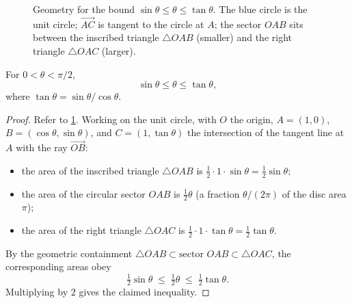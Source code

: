 \begin{figure}[H]
\centering
{}
\caption{Geometry for the bound \(\sin \theta \leq \theta \leq \tan \theta\). The blue circle is the unit circle; \(\overrightarrow{AC}\) is tangent to the circle at \(A\); the sector \(OAB\) sits between the inscribed triangle \(\triangle OAB\) (smaller) and the right triangle \(\triangle OAC\) (larger).}
\label{fig:sector-bound}
\end{figure}

\begin{lemma}\label{lem:sector-inequality}
For \(0 < \theta < \pi/2\),
\[
\sin \theta \leq \theta \leq \tan \theta,
\]
where \(\tan \theta = \sin \theta / \cos \theta\).
\end{lemma}

\begin{proof}
Refer to \cref{fig:sector-bound}. Working on the unit circle, with \(O\) the origin, \(A = (1, 0)\), \(B = (\cos \theta, \sin \theta)\), and \(C = (1, \tan \theta)\) the intersection of the tangent line at \(A\) with the ray \(\overrightarrow{OB}\):
\begin{itemize}
    \item the area of the inscribed triangle \(\triangle OAB\) is \(\tfrac{1}{2} \cdot 1 \cdot \sin \theta = \tfrac{1}{2} \sin \theta\);
    \item the area of the circular sector \(OAB\) is \(\tfrac{1}{2} \theta\) (a fraction \(\theta / (2\pi)\) of the disc area \(\pi\));
    \item the area of the right triangle \(\triangle OAC\) is \(\tfrac{1}{2} \cdot 1 \cdot \tan \theta = \tfrac{1}{2} \tan \theta\).
\end{itemize}
By the geometric containment \(\triangle OAB \subset \text{sector } OAB \subset \triangle OAC\), the corresponding areas obey
\[
\tfrac{1}{2} \sin \theta \;\leq\; \tfrac{1}{2} \theta \;\leq\; \tfrac{1}{2} \tan \theta.
\]
Multiplying by \(2\) gives the claimed inequality.
\end{proof}

